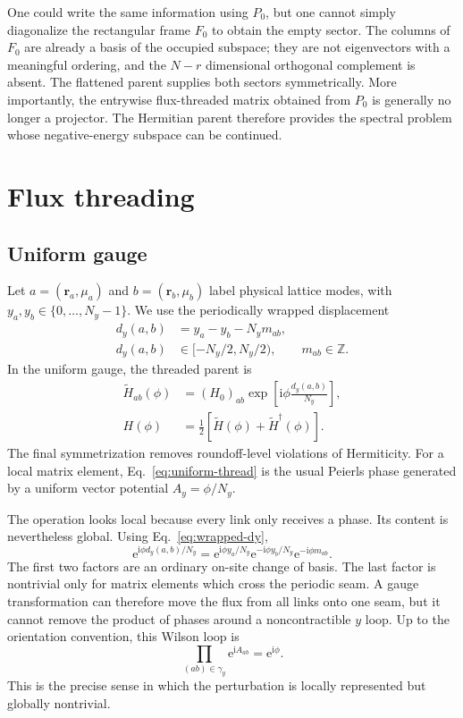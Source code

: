 \documentclass[aps,prb,twocolumn,floatfix,nofootinbib,superscriptaddress]{revtex4-2}
\newcommand{\ii}{\mathrm{i}}
\newcommand{\e}{\mathrm{e}}
\begin{document}
One could write the same information using $P_0$, but one cannot simply
diagonalize the rectangular frame $F_0$ to obtain the empty sector.  The
columns of $F_0$ are already a basis of the occupied subspace; they are not
eigenvectors with a meaningful ordering, and the $N-r$ dimensional
orthogonal complement is absent.  The flattened parent supplies both
sectors symmetrically.  More importantly, the entrywise flux-threaded matrix
obtained from $P_0$ is generally no longer a projector.  The Hermitian parent
therefore provides the spectral problem whose negative-energy subspace can
be continued.

\section{Flux threading}

\subsection{Uniform gauge}

Let $a=(\boldsymbol r_a,\mu_a)$ and $b=(\boldsymbol r_b,\mu_b)$ label physical
lattice modes, with $y_a,y_b\in\{0,\ldots,N_y-1\}$.  We use the periodically
wrapped displacement
\begin{equation}
 \begin{aligned}
 d_y(a,b)&=y_a-y_b-N_y m_{ab},\\
 d_y(a,b)&\in[-N_y/2,N_y/2),\qquad m_{ab}\in\mathbb Z .
 \end{aligned}
 \label{eq:wrapped-dy}
\end{equation}
In the uniform gauge, the threaded parent is
\begin{align}
 \widetilde H_{ab}(\phi)
  &=(H_0)_{ab}\exp\!\left[\ii\phi\frac{d_y(a,b)}{N_y}\right],\nonumber\\
 H(\phi)&=\frac{1}{2}\left[\widetilde H(\phi)
 +\widetilde H^\dagger(\phi)\right].
 \label{eq:uniform-thread}
\end{align}
The final symmetrization removes roundoff-level violations of Hermiticity.
For a local matrix element, Eq.~\eqref{eq:uniform-thread} is the usual
Peierls phase generated by a uniform vector potential $A_y=\phi/N_y$.

The operation looks local because every link only receives a phase.  Its
content is nevertheless global.  Using Eq.~\eqref{eq:wrapped-dy},
\begin{equation}
 \e^{\ii\phi d_y(a,b)/N_y}
 =\e^{\ii\phi y_a/N_y}\e^{-\ii\phi y_b/N_y}
  \e^{-\ii\phi m_{ab}} .
 \label{eq:gauge-factorization}
\end{equation}
The first two factors are an ordinary on-site change of basis.  The last
factor is nontrivial only for matrix elements which cross the periodic seam.
A gauge transformation can therefore move the flux from all links onto one
seam, but it cannot remove the product of phases around a noncontractible
$y$ loop.  Up to the orientation convention, this Wilson loop is
\begin{equation}
 \prod_{(ab)\in\gamma_y}\e^{\ii A_{ab}}=\e^{\ii\phi}.
 \label{eq:holonomy}
\end{equation}
This is the precise sense in which the perturbation is locally represented
but globally nontrivial.
\end{document}

